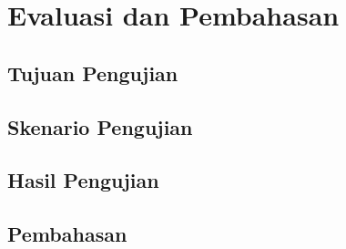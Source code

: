 \chapter{Evaluasi dan Pembahasan}

\section{Tujuan Pengujian}
\blindtext

\section{Skenario Pengujian}
\blindtext

\section{Hasil Pengujian}
\blindtext

\section{Pembahasan}
\blindtext
